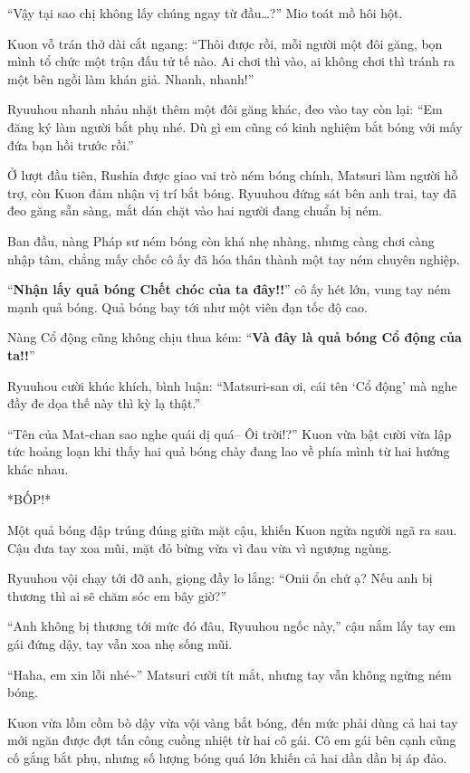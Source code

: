 \documentclass[../main.tex]{subfiles}
\begin{document}
``Vậy tại sao chị không lấy chúng ngay từ đầu\dots?'' Mio toát mồ hôi hột.

Kuon vỗ trán thở dài cắt ngang: ``Thôi được rồi, mỗi người một đôi găng, bọn mình tổ chức một trận đấu tử tế nào. Ai chơi thì vào, ai không chơi thì tránh ra một bên ngồi làm khán giả. Nhanh, nhanh!''

Ryuuhou nhanh nhảu nhặt thêm một đôi găng khác, đeo vào tay còn lại: ``Em đăng ký làm người bắt phụ nhé. Dù gì em cũng có kinh nghiệm bắt bóng với mấy đứa bạn hồi trước rồi.''

\ct

Ở lượt đầu tiên, Rushia được giao vai trò ném bóng chính, Matsuri làm người hỗ trợ, còn Kuon đảm nhận vị trí bắt bóng. Ryuuhou đứng sát bên anh trai, tay đã đeo găng sẵn sàng, mắt dán chặt vào hai người đang chuẩn bị ném.

Ban đầu, nàng Pháp sư ném bóng còn khá nhẹ nhàng, nhưng càng chơi càng nhập tâm, chẳng mấy chốc cô ấy đã hóa thân thành một tay ném chuyên nghiệp.

``\textbf{Nhận lấy quả bóng Chết chóc của ta đây!!}'' cô ấy hét lớn, vung tay ném mạnh quả bóng. Quả bóng bay tới như một viên đạn tốc độ cao.

Nàng Cổ động cũng không chịu thua kém: ``\textbf{Và đây là quả bóng Cổ động của ta!!}''

Ryuuhou cười khúc khích, bình luận: ``Matsuri-san ơi, cái tên `Cổ động' mà nghe đầy đe dọa thế này thì kỳ lạ thật.''

``Tên của Mat-chan sao nghe quái dị quá-- Ôi trời!?'' Kuon vừa bật cười vừa lập tức hoảng loạn khi thấy hai quả bóng chày đang lao về phía mình từ hai hướng khác nhau.

*BỐP!*

Một quả bóng đập trúng đúng giữa mặt cậu, khiến Kuon ngửa người ngã ra sau. Cậu đưa tay xoa mũi, mặt đỏ bừng vừa vì đau vừa vì ngượng ngùng.

Ryuuhou vội chạy tới đỡ anh, giọng đầy lo lắng: ``Onii ổn chứ ạ? Nếu anh bị thương thì ai sẽ chăm sóc em bây giờ?''

``Anh không bị thương tới mức đó đâu, Ryuuhou ngốc này,'' cậu nắm lấy tay em gái đứng dậy, tay vẫn xoa nhẹ sống mũi.

``Haha, em xin lỗi nhé\~{}'' Matsuri cười tít mắt, nhưng tay vẫn không ngừng ném bóng.

Kuon vừa lồm cồm bò dậy vừa vội vàng bắt bóng, đến mức phải dùng cả hai tay mới ngăn được đợt tấn công cuồng nhiệt từ hai cô gái. Cô em gái bên cạnh cũng cố gắng bắt phụ, nhưng số lượng bóng quá lớn khiến cả hai dần dần bị áp đảo.
\end{document}
